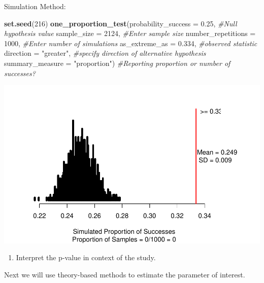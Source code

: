 \documentclass[
]{report}
\newenvironment{Shaded}{\begin{snugshade}}{\end{snugshade}}
\newcommand{\AttributeTok}[1]{\textcolor[rgb]{0.13,0.29,0.53}{#1}}
\newcommand{\CommentTok}[1]{\textcolor[rgb]{0.56,0.35,0.01}{\textit{#1}}}
\newcommand{\DecValTok}[1]{\textcolor[rgb]{0.00,0.00,0.81}{#1}}
\newcommand{\FloatTok}[1]{\textcolor[rgb]{0.00,0.00,0.81}{#1}}
\newcommand{\FunctionTok}[1]{\textcolor[rgb]{0.13,0.29,0.53}{\textbf{#1}}}
\newcommand{\NormalTok}[1]{#1}
\newcommand{\StringTok}[1]{\textcolor[rgb]{0.31,0.60,0.02}{#1}}
\providecommand{\tightlist}{%
  \setlength{\itemsep}{0pt}\setlength{\parskip}{0pt}}
\begin{document}
Simulation Method:

\begin{Shaded}
\begin{Highlighting}[]
\FunctionTok{set.seed}\NormalTok{(}\DecValTok{216}\NormalTok{)}
\FunctionTok{one\_proportion\_test}\NormalTok{(}\AttributeTok{probability\_success =} \FloatTok{0.25}\NormalTok{, }\CommentTok{\#Null hypothesis value}
                    \AttributeTok{sample\_size =} \DecValTok{2124}\NormalTok{, }\CommentTok{\#Enter sample size}
                    \AttributeTok{number\_repetitions =} \DecValTok{1000}\NormalTok{, }\CommentTok{\#Enter number of simulations}
                    \AttributeTok{as\_extreme\_as =} \FloatTok{0.334}\NormalTok{, }\CommentTok{\#observed statistic}
                    \AttributeTok{direction =} \StringTok{"greater"}\NormalTok{, }\CommentTok{\#specify direction of alternative hypothesis}
                    \AttributeTok{summary\_measure =} \StringTok{"proportion"}\NormalTok{) }\CommentTok{\#Reporting proportion or number of successes?}
\end{Highlighting}
\end{Shaded}

\begin{center}\includegraphics[width=0.8\linewidth]{05-UR-module4_review_files/figure-latex/unnamed-chunk-2-1} \end{center}

\begin{enumerate}
\def\labelenumi{\arabic{enumi}.}
\setcounter{enumi}{9}
\tightlist
\item
  Interpret the p-value in context of the study.
\end{enumerate}

\vspace{0.8in}

Next we will use theory-based methods to estimate the parameter of interest.
\end{document}
